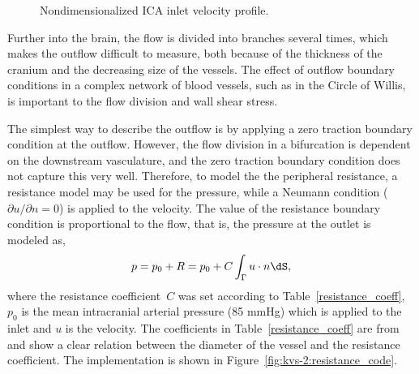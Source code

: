\begin{figure}
  \begin{center}  \end{center} \caption{Nondimensionalized ICA inlet velocity
    profile.}  \label{fig:kvs-2:ford}
\end{figure}

Further into the brain, the flow is divided into branches several
times, which makes the outflow difficult to measure, both because of
the thickness of the cranium and the decreasing size of the vessels.
The effect of outflow boundary conditions in a complex network of
blood vessels, such as in the Circle of Willis, is important to the
flow division and wall shear stress.

The simplest way to describe the outflow is by applying a zero
traction boundary condition at the outflow. However, the flow division
in a bifurcation is dependent on the downstream vasculature, and the
zero traction boundary condition does not capture this very
well. Therefore, to model the the peripheral resistance, a resistance
model may be used for the pressure, while a Neumann condition
(${\partial u / \partial n} = 0 $) is applied to the velocity. The
value of the resistance boundary condition is proportional to the
flow, that is, the pressure at the outlet is modeled as,
\begin{equation}
  p = p_0 + R = p_0 + C \int_\Gamma u \cdot n \dS,
\end{equation}
where the resistance coefficient~$C$ was set according to
Table~\ref{resistance_coeff}, $p_0$ is the mean intracranial arterial
pressure (85 mmHg) which is applied to the inlet and $u$ is the
velocity. The coefficients in Table~\ref{resistance_coeff} are
from~\citet{AlastrueyParkerPeiroEtAl2007} and show a clear relation
between the diameter of the vessel and the resistance coefficient. The
implementation is shown in Figure~\ref{fig:kvs-2:resistance_code}.

